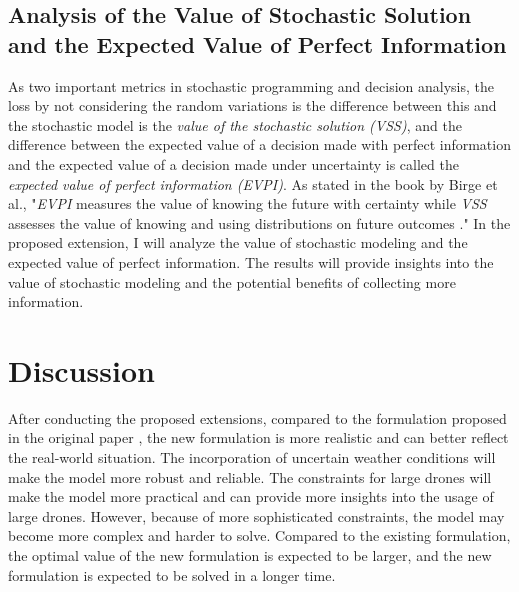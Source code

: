 \documentclass{lxaiproposal}
\begin{document}
\subsection{Analysis of the Value of Stochastic Solution and the Expected Value of Perfect Information}
\vspace*{-2mm}
As two important metrics in stochastic programming and decision analysis, the loss by not considering the random variations is the difference between this and the stochastic model is the \textit{value of the stochastic solution (VSS)}, and the difference between the expected value of a decision made with perfect information and the expected value of a decision made under uncertainty is called the \textit{expected value of perfect information (EVPI)}. As stated in the book by Birge et al., "\textit{EVPI} measures the value of knowing the future with certainty while \textit{VSS} assesses the value of knowing and using distributions on future outcomes \cite{birge2011introduction}." In the proposed extension, I will analyze the value of stochastic modeling and the expected value of perfect information. The results will provide insights into the value of stochastic modeling and the potential benefits of collecting more information.


\section{Discussion}
\vspace*{-3mm}


After conducting the proposed extensions, compared to the formulation proposed in the original paper \cite{dukkanci2023drones}, the new formulation is more realistic and can better reflect the real-world situation. The incorporation of uncertain weather conditions will make the model more robust and reliable. The constraints for large drones will make the model more practical and can provide more insights into the usage of large drones. However, because of more sophisticated constraints, the model may become more complex and harder to solve. Compared to the existing formulation, the optimal value of the new formulation is expected to be larger, and the new formulation is expected to be solved in a longer time.



\end{document}

